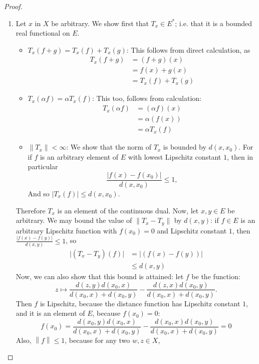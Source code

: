 \documentclass[12pt]{article}
\theoremstyle{definition}
\begin{document}
\begin{proof}
	\begin{enumerate}[label=(\roman*)]
		\item Let $x$ in $X$ be arbitrary. We show first that $T_x \in E^{*}$; i.e. that it is a bounded real functional on $E$. 
			\begin{itemize}
				\item $T_x(f + g) = T_x(f) + T_x(g)$: This follows from direct calculation, as 
					\begin{align*}
						T_x(f + g) &= (f + g)(x) \\
						&= f(x) + g(x)\\
						&= T_x(f) + T_x(g)
					\end{align*}
				\item $T_x(\alpha f) = \alpha T_x(f)$: This too, follows from calculation:
					\begin{align*}
						T_x(\alpha f) &= (\alpha f)(x)\\
						&= \alpha (f(x))\\
						&= \alpha T_x(f)
					\end{align*}
				\item $\left \lVert { T_x } \right \lVert  < \infty$: We show that the norm of $T_x$ is bounded by $d(x,x_0)$. For if $f$ is an arbitrary element of $E$ with lowest Lipschitz constant $1$, then in particular 
					\[\frac{\lvert f(x) - f(x_0) \rvert}{d(x,x_0)} \leq 1,\]
					And so $\lvert T_x(f ) \rvert \leq d(x,x_0)$. 
			\end{itemize}
			Therefore $T_x$ is an element of the continuous dual. Now, let $x, y\in E$ be arbitrary. We may bound the value of $\lVert T_x - T_y \rVert$ by $d(x,y)$: if $f \in E$ is an arbitrary Lipschitz function with $f(x_0) = 0$ and Lipschitz constant $1$, then $\frac{\left \lvert { f(x) - f(y) } \right \lvert }{d(x,y)} \leq 1$, so
			\begin{align*}
				\lvert (T_x - T_y)(f) \rvert &= \lvert (f(x) - f(y)) \rvert\\
				&\leq d(x,y)
			\end{align*}
			Now, we can also show that this bound is attained: let $f$ be the function:
			\[z \mapsto \frac{d(z,y)d(x_0,x)}{d(x_0,x)+d(x_0,y)} - \frac{d(z,x)d(x_0,y)}{d(x_0,x)+d(x_0,y)}.\]
			Then $f$ is Lipschitz, because the distance function has Lipschitz constant $1$, and it is an element of $E$, because $f(x_0) = 0$:
			\[f(x_0) = \frac{d(x_0,y)d(x_0,x)}{d(x_0,x)+d(x_0,y)} - \frac{d(x_0,x)d(x_0,y)}{d(x_0,x)+d(x_0,y)} = 0\]
			Also, $\left \lVert { f } \right \lVert \leq1$, because for any two $w,z \in X$,

\end{enumerate}
\end{proof}
\end{document}
